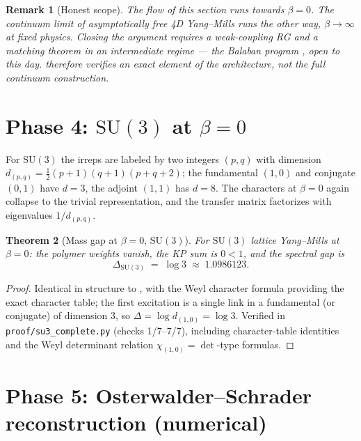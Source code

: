 \documentclass[11pt,a4paper]{article}
\newtheorem{theorem}{Theorem}[section]
\newtheorem{remark}[theorem]{Remark}
\newcommand{\SU}{\mathrm{SU}}
\newcommand{\gap}{\Delta}
\begin{document}
\begin{remark}[Honest scope]
The flow of this section runs \emph{towards} $\beta = 0$.  The continuum
limit of asymptotically free 4D Yang--Mills runs the other way,
$\beta \to \infty$ at fixed physics.  Closing the argument requires a
weak-coupling RG and a matching theorem in an intermediate regime --- the
Balaban program \cite{balaban1981, balaban1983}, open to this day.
 therefore verifies an exact \emph{element} of the
architecture, not the full continuum construction.
\end{remark}

\section{Phase 4: $\SU(3)$ at $\beta = 0$}
\label{sec:phase4}

For $\SU(3)$ the irreps are labeled by two integers $(p, q)$ with dimension
$d_{(p,q)} = \tfrac12 (p+1)(q+1)(p+q+2)$; the fundamental $(1,0)$ and
conjugate $(0,1)$ have $d = 3$, the adjoint $(1,1)$ has $d = 8$.  The
characters at $\beta = 0$ again collapse to the trivial representation, and
the transfer matrix factorizes with eigenvalues $1/d_{(p,q)}$.

\begin{theorem}[Mass gap at $\beta = 0$, $\SU(3)$]
\label{thm:su3}
For $\SU(3)$ lattice Yang--Mills at $\beta = 0$: the polymer weights vanish,
the KP sum is $0 < 1$, and the spectral gap is
\begin{equation}
  \gap_{\SU(3)} \;=\; \log 3 \;\approx\; 1.0986123 .
  \label{eq:su3gap}
\end{equation}
\end{theorem}

\begin{proof}
Identical in structure to , with the Weyl character formula
providing the exact character table; the first excitation is a single link
in a fundamental (or conjugate) of dimension $3$, so
$\gap = \log d_{(1,0)} = \log 3$.  Verified in
\texttt{proof/su3\_complete.py} (checks 1/7--7/7), including character-table
identities and the Weyl determinant relation
$\chi_{(1,0)} = \det$-type formulas.
\end{proof}

\section{Phase 5: Osterwalder--Schrader reconstruction (numerical)}
\label{sec:phase5}
\end{document}
